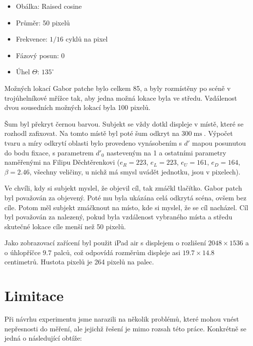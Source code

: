 \begin{itemize}
\item Obálka: Raised cosine
\item Průměr: 50 pixelů
\item Frekvence: $1/16$ cyklů na pixel
\item Fázový posun: 0
\item Úhel $\Theta$: $135^\circ$ 
\end{itemize}

Možných lokací Gabor patche bylo celkem 85, a byly rozmístěny po scéně v
trojúhelníkové mřížce tak, aby jedna možná lokace byla ve středu. Vzdálenost
dvou sousedních možných lokací byla 100 pixelů. 

Šum byl překryt černou barvou. Subjekt se vždy dotkl displeje v místě, které se
rozhodl zafixovat. Na tomto místě byl poté šum odkryt na $300
\operatorname{ms}$. Výpočet tvaru a míry odkrytí oblasti bylo provedeno
vynásobením s $d'$ mapou posunutou do bodu fixace, s parametrem $d'_0$
nasteveným na 1 a ostatními parametry naměřenými na Filipu Děchtěrenkovi
($e_R=223$, $e_L=223$, $e_U = 161$, $e_D = 164$, $\beta=2.46$, všechny
veličiny, u nichž má smysl uvádět jednotku, jsou v pixelech).

Ve chvíli, kdy si subjekt myslel, že objevil cíl, tak zmáčkl tlačítko. Gabor
patch byl považován za objevený. Poté mu byla ukázána celá odkrytá scéna, ovšem
bez cíle. Potom měl subjekt zmáčknout na místo, kde si myslel, že se cíl
nacházel. Cíl byl považován za nalezený, pokud byla vzdálenost vybraného místa
a středu skutečné lokace cíle menší než 50 pixelů. 

Jako zobrazovací zařícení byl použit iPad air s displejem o rozlišení
$2048\times1536$ a o úhlopříčce $9.7$ palců, což odpovídá rozměrům displeje asi
$19.7 \times 14.8$ centimetrů. Hustota pixelů je 264 pixelů na palec. 

\section{Limitace}

Při návrhu experimentu jsme narazili na několik problémů, které mohou vnést
nepřesnosti do měření, ale jejichž řešení je mimo rozsah této práce. Konkrétně
se jedná o následující obtíže:

